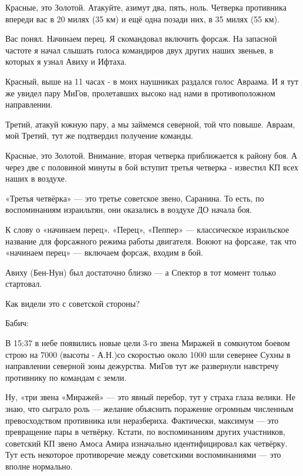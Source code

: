 \begin{textcitation}
	Красные, это Золотой. Атакуйте, азимут два, пять, ноль. Четверка противника впереди вас в 20 милях (35 км) и ещё одна позади них, в 35 милях (55 км).
	
	Вас понял. Начинаем перец. Я скомандовал включить форсаж. На запасной частоте я начал слышать голоса командиров двух других наших звеньев, в которых я узнал Авиху и Ифтаха.
	
	Красный, выше на 11 часах - в моих наушниках раздался голос Авраама. И я тут же увидел пару МиГов, пролетавших высоко над нами в противоположном направлении.
	
	Третий, атакуй южную пару, а мы займемся северной, той что повыше. Авраам, мой Третий, тут же подтвердил получение команды.
	
	Красные, это Золотой. Внимание, вторая четверка приближается к району боя. А через две с половиной минуты в бой вступит третья четверка - известил КП всех наших в воздухе.
\end{textcitation}


«Третья четвёрка» — это третье советское звено, Саранина. То есть, по воспоминаниям израильтян, они оказались в воздухе ДО начала боя.

К слову о «начинаем перец». «Перец», «Пеппер» — классическое израильское название для форсажного режима работы двигателя. Воюют на форсаже, так что «начинаем перец» — включаем форсаж, входим в бой.

Авиху (Бен-Нун) был достаточно близко — а Спектор в тот момент только стартовал.

Как видели это с советской стороны?

Бабич:

\begin{textcitation}
	В 15:37 в небе появились новые цели 3-го звена Миражей в сомкнутом боевом строю на 7000 (высоты - А.Н.)со скоростью около 1000 шли севернее Сухны в направлении северной зоны дежурства. МиГов тут же развернули навстречу противнику по командам с земли.
\end{textcitation}

Ну, «три звена «Миражей» — это явный перебор, тут у страха глаза велики. Не знаю, что сыграло роль — желание объяснить поражение огромным численным превосходством противника или неразбериха. Фактически, максимум — это превращение пары в четвёрку. Кстати, по воспоминаниям других участников, советский КП звено Амоса Амира изначально идентифицировал как четвёрку. Тут есть некоторое противоречие между советскими воспоминаниями — это вполне нормально.

